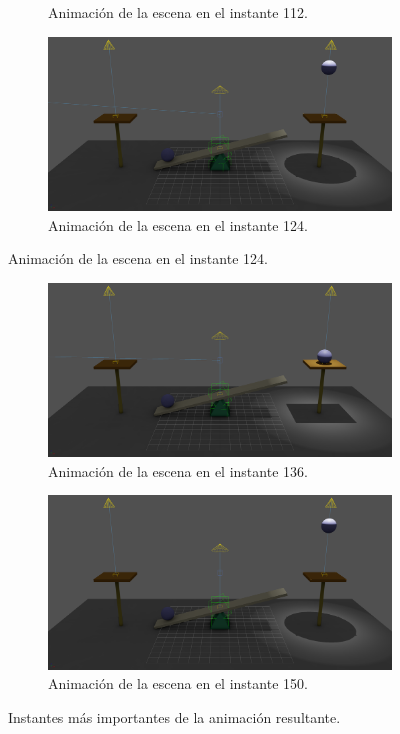 \documentclass{article}
\begin{document}
\begin{figure}[H]
\begin{subfigure}[t]{0.48\textwidth}
    \caption{Animación de la escena en el instante 112.}
 \end{subfigure}
\hfill
 \begin{subfigure}[t]{0.48\textwidth}
    \centering
    \includegraphics[width=\textwidth]{imagenes/animaciones/general/124.png}
    \caption{Animación de la escena en el instante 124.}
 \end{subfigure}
\end{figure}

\begin{figure}[H]\ContinuedFloat
 \begin{subfigure}[t]{0.48\textwidth}
    \centering
    \includegraphics[width=\textwidth]{imagenes/animaciones/general/136.png}
    \caption{Animación de la escena en el instante 136.}
 \end{subfigure}
\hfill
 \begin{subfigure}[t]{0.48\textwidth}
    \centering
    \includegraphics[width=\textwidth]{imagenes/animaciones/general/150.png}
    \caption{Animación de la escena en el instante 150.}
 \end{subfigure}
 \caption{Instantes más importantes de la animación resultante.}
\end{figure}
\end{document}

